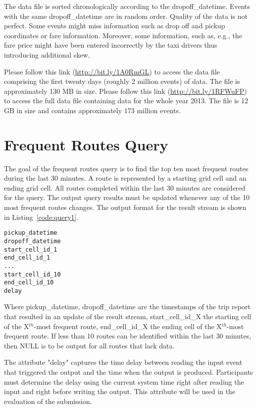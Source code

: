 \documentclass{sig-alternate}
\begin{document}
The data file is sorted chronologically according to the dropoff\_datetime. Events with the same dropoff\_datetime are in random order. Quality of the data is not perfect. Some events might miss information such as drop off and pickup coordinates or fare information. Moreover, some information, such as, e.g., the fare price might have been entered incorrectly by the taxi drivers thus introducing additional skew.

Please follow this link (\url{http://bit.ly/1A0RmGL}) to access the data file comprising the first twenty days (roughly 2 million events) of data. The file is approximately 130 MB in size. Please follow this link (\url{http://bit.ly/1RFWuFP}) to access the full data file containing data for the whole year 2013. The file is 12 GB in size and contains approximately 173 million events.

\section{Frequent Routes Query}
The goal of the frequent routes query is to find the top ten most frequent routes during the last 30 minutes. A route is represented by a starting grid cell and an ending grid cell. All routes completed within the last 30 minutes are considered for the query. The output query results must be updated whenever any of the 10 most frequent routes changes. The output format for the result stream is shown in Listing~\ref{code:query1}.

\begin{lstlisting}[float=ht,caption={Output format for the frequent routes query},label={code:query1}]
pickup_datetime 
dropoff_datetime 
start_cell_id_1 
end_cell_id_1
...
start_cell_id_10 
end_cell_id_10 
delay
\end{lstlisting}

Where pickup\_datetime, dropoff\_datetime are the timestamps of the trip report that resulted in an update of the result stream, start\_cell\_id\_X the starting cell of the X$^{th}$-most frequent route, end\_cell\_id\_X the ending cell of the X$^{th}$-most frequent route. If less than 10 routes can be identified within the last 30 minutes, then NULL is to be output for all routes that lack data.

The attribute "delay" captures the time delay between reading the input event that triggered the output and the time when the output is produced. Participants must determine the delay using the current system time right after reading the input and right before writing the output. This attribute will be used in the evaluation of the submission.
\end{document}
